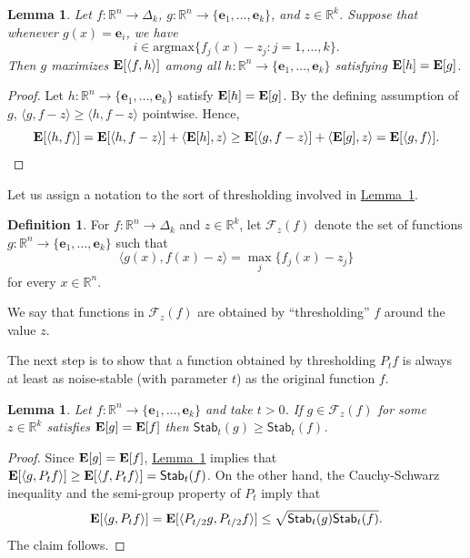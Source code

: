 \documentclass[11pt]{article}
\numberwithin{equation}{section}
\newtheorem{lemma}[theorem]{Lemma}
\theoremstyle{definition}
\newtheorem{definition}[theorem]{Definition}
\theoremstyle{plain}
\newcommand{\R}{\mathbb R}
\newcommand{\expref}[2]{\hyperref[#2]{#1~\ref{#2}}}
\newcommand{\E}{{\bf E}}
\newcommand{\inr}[2]{\langle #1, #2 \rangle}
\newcommand{\calF}{\mathcal{F}}
\newcommand{\Stab}{\mathsf{Stab}}
\begin{document}
\begin{lemma}\label{lem:rounding-correlation}
  Let $f: \R^n \to \Delta_k$, $g: \R^n \to \{\mathbf{e}_1, \dots, \mathbf{e}_k\}$, and $z \in \R^k$.
  Suppose that whenever $g(x) = \mathbf{e}_i$, we have
  \[
    i \in \mathrm{argmax}\{f_j(x) - z_j: j = 1, \dots, k\}.
  \]
  Then $g$ maximizes $\E[\langle f, h \rangle]$ among all
  $h: \R^n \to \{\mathbf{e}_1, \dots, \mathbf{e}_k\}$ satisfying $\E [h] = \E[g]$.
\end{lemma}

\begin{proof}
  Let $h: \R^n \to \{\mathbf{e}_1, \dots, \mathbf{e}_k\}$ satisfy $\E[h] = \E[g]$. By the defining assumption of $g$,
  $\inr{g}{f-z} \ge \inr{h}{f-z}$ pointwise. Hence,
  \[
    \E[\inr{h}{f}] = \E[\inr{h}{f-z}] + \inr{\E[h]}{z} \ge \E[\inr{g}{f-z}] + \inr{\E[g]}{z} = \E[\inr{g}{f}]. \qedhere
  \]
\end{proof}

Let us assign a notation to the sort of thresholding involved in \expref{Lemma}{lem:rounding-correlation}.

\begin{definition}
  For $f: \R^n \to \Delta_k$ and $z \in \R^k$, let $\calF_z(f)$ denote the set of functions $g: \R^n \to \{\mathbf{e}_1, \dots, \mathbf{e}_k\}$
  such that
  \[
      \langle g(x), f(x) - z \rangle = \max_j \{f_j(x) - z_j\}
  \]
  for every $x \in \R^n$.
\end{definition}

We say that functions in $\calF_z(f)$ are obtained by ``thresholding'' $f$ around the value $z$.

The next step is to show that a function obtained by thresholding $P_t f$ is always at least as noise-stable (with parameter $t$)
as the original function $f$. 

\begin{lemma}\label{lem:rounding-stability}
  Let $f: \R^n \to \{\mathbf{e}_1, \dots, \mathbf{e}_k\}$ and take $t > 0$. If $g \in \calF_z(f)$ for some $z \in \R^k$
  satisfies $\E[g] = \E[f]$
  then $\Stab_t(g) \ge \Stab_t(f)$.
\end{lemma}

\begin{proof}
  Since $\E[g] = \E[f]$, \expref{Lemma}{lem:rounding-correlation} implies that
  $\E[\langle g, P_t f\rangle] \ge \E[\langle f, P_t f\rangle] = \Stab_t(f)$. On the other hand,
  the Cauchy-Schwarz inequality and the semi-group property of $P_t$ imply that
  \[
    \E[\langle g, P_t f \rangle]
    = \E[\langle P_{t/2} g, P_{t/2} f \rangle]
    \le \sqrt{\Stab_t(g) \Stab_t(f)}.
  \]
  The claim follows.
\end{proof}
\end{document}

